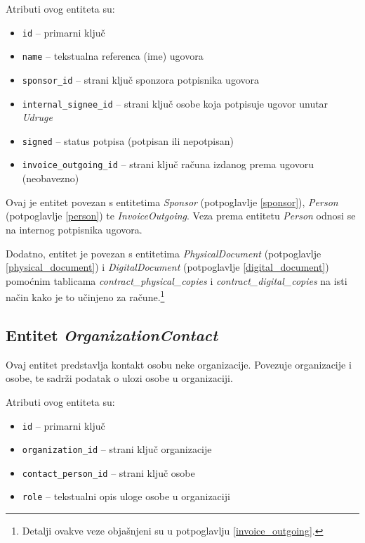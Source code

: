 \documentclass[times, utf8, diplomski]{fer}
\begin{document}
\medskip
Atributi ovog entiteta su:
\begin{itemize}
    \item \texttt{id} -- primarni ključ
    \item \texttt{name} -- tekstualna referenca (ime) ugovora
    \item \texttt{sponsor\_id} -- strani ključ sponzora potpisnika ugovora
    \item \texttt{internal\_signee\_id} -- strani ključ osobe koja potpisuje
        ugovor unutar \emph{Udruge}
    \item \texttt{signed} -- status potpisa (potpisan ili nepotpisan)
    \item \texttt{invoice\_outgoing\_id} -- strani ključ računa izdanog prema
        ugovoru (neobavezno)
\end{itemize}

Ovaj je entitet povezan s entitetima \emph{Sponsor} (potpoglavlje
\ref{sponsor}), \emph{Person} (potpoglavlje \ref{person}) te
\emph{InvoiceOutgoing}. Veza prema entitetu \emph{Person} odnosi se na
internog potpisnika ugovora.

Dodatno, entitet je povezan s entitetima \emph{PhysicalDocument} (potpoglavlje
\ref{physical_document}) i \emph{DigitalDocument} (potpoglavlje
\ref{digital_document}) pomoćnim tablicama \emph{contract\_physical\_copies} i
\emph{contract\_digital\_copies} na isti način kako je to učinjeno za
račune.\footnote{Detalji ovakve veze objašnjeni su u potpoglavlju
    \ref{invoice_outgoing}.}

\subsection{Entitet \emph{OrganizationContact}} \label{organization_contact}

Ovaj entitet predstavlja kontakt osobu neke organizacije. Povezuje organizacije
i osobe, te sadrži podatak o ulozi osobe u organizaciji.

\medskip
Atributi ovog entiteta su:
\begin{itemize}
    \item \texttt{id} -- primarni ključ
    \item \texttt{organization\_id} -- strani ključ organizacije
    \item \texttt{contact\_person\_id} -- strani ključ osobe
    \item \texttt{role} -- tekstualni opis uloge osobe u organizaciji
\end{itemize}
\end{document}
